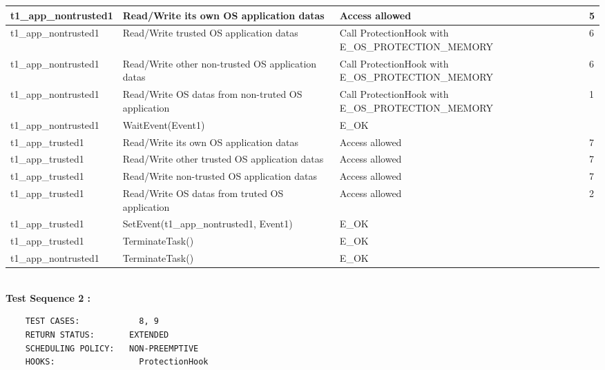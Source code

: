 \documentclass[10pt]{article}
\newlength{\Li}\settowidth{\Li}{Running}
\newlength{\Lii}\setlength{\Lii}{7cm}
\newlength{\Liiii}\setlength{\Liiii}{0.9cm}
\newlength{\Liii}\setlength{\Liii}{\textwidth} \addtolength{\Liii}{-\Li} \addtolength{\Liii}{-\Lii} \addtolength{\Liii}{-\Liiii}
\begin{document}
	\begin{supertabular}{|p{\Li}|p{\Lii}|p{\Liii}|p{\Liiii}|} \hline 
	t1\_app\_nontrusted1	& Read/Write its own OS application datas		& Access allowed									& 5 \\ \hline
	t1\_app\_nontrusted1	& Read/Write trusted OS application datas		& Call ProtectionHook with E\_OS\_PROTECTION\_MEMORY		& 6 \\ \hline
	t1\_app\_nontrusted1	& Read/Write other non-trusted OS application datas & Call ProtectionHook with E\_OS\_PROTECTION\_MEMORY	& 6 \\ \hline
	t1\_app\_nontrusted1	& Read/Write OS datas from non-truted OS application	& Call ProtectionHook with E\_OS\_PROTECTION\_MEMORY	& 1 \\ \hline
	t1\_app\_nontrusted1	& WaitEvent(Event1)							& E\_OK											& \\ \hline
	
	t1\_app\_trusted1		& Read/Write its own OS application datas		& Access allowed									& 7 \\ \hline
	t1\_app\_trusted1		& Read/Write other trusted OS application datas 	& Access allowed									& 7 \\ \hline
	t1\_app\_trusted1		& Read/Write non-trusted OS application datas	& Access allowed									& 7 \\ \hline
	t1\_app\_trusted1		& Read/Write OS datas from truted OS application	& Access allowed									& 2 \\ \hline
	t1\_app\_trusted1		& SetEvent(t1\_app\_nontrusted1, Event1)		& E\_OK											& \\ \hline
	
	t1\_app\_trusted1		& TerminateTask()							& E\_OK											& \\ \hline
	t1\_app\_nontrusted1	& TerminateTask()							& E\_OK											& \\ \hline
	\end{supertabular}\\

	\textbf{Test Sequence 2 :}
	\begin{lstlisting}
	TEST CASES:		       8, 9
	RETURN STATUS:	  	 EXTENDED
	SCHEDULING POLICY:   NON-PREEMPTIVE
	HOOKS:		           ProtectionHook
	\end{lstlisting}
	
\end{document}
